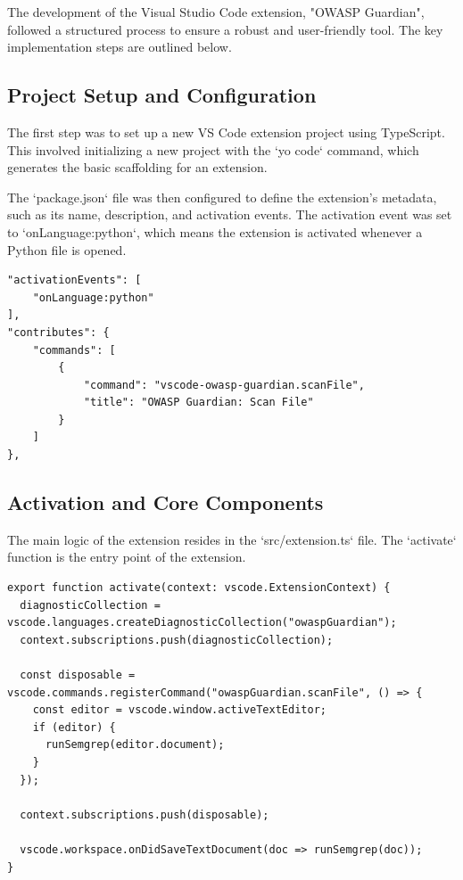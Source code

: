 The development of the Visual Studio Code extension, "OWASP Guardian", followed a structured process to ensure a robust and user-friendly tool. The key implementation steps are outlined below.

\subsection{Project Setup and Configuration}

The first step was to set up a new VS Code extension project using TypeScript. This involved initializing a new project with the `yo code` command, which generates the basic scaffolding for an extension.

The `package.json` file was then configured to define the extension's metadata, such as its name, description, and activation events. The activation event was set to `onLanguage:python`, which means the extension is activated whenever a Python file is opened.

\begin{verbatim}
"activationEvents": [
    "onLanguage:python"
],
"contributes": {
    "commands": [
        {
            "command": "vscode-owasp-guardian.scanFile",
            "title": "OWASP Guardian: Scan File"
        }
    ]
},
\end{verbatim}

\subsection{Activation and Core Components}

The main logic of the extension resides in the `src/extension.ts` file. The `activate` function is the entry point of the extension.

\begin{verbatim}
export function activate(context: vscode.ExtensionContext) {
  diagnosticCollection = vscode.languages.createDiagnosticCollection("owaspGuardian");
  context.subscriptions.push(diagnosticCollection);

  const disposable = vscode.commands.registerCommand("owaspGuardian.scanFile", () => {
    const editor = vscode.window.activeTextEditor;
    if (editor) {
      runSemgrep(editor.document);
    }
  });

  context.subscriptions.push(disposable);

  vscode.workspace.onDidSaveTextDocument(doc => runSemgrep(doc));
}
\end{verbatim}

